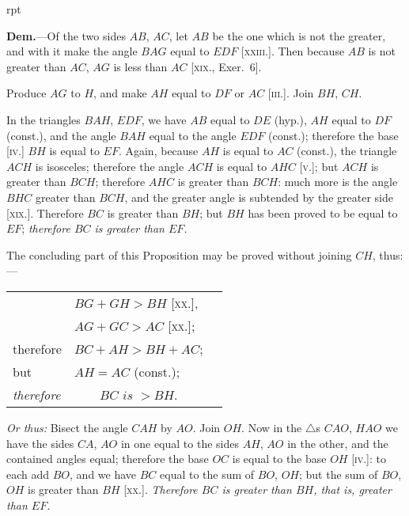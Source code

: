 \documentclass[oneside]{book}
\newcounter{wrapwidth}
\newcommand\imgflow[3]{
\setcounter{wrapwidth}{#1}

\begin{wrapfigure}[#2]{r}{\value{wrapwidth}pt}
\begin{center}
\vspace{-0.3in}

\end{center}
\end{wrapfigure}
}
\begin{document}
\imgflow{180}{12}{f041}

\textbf{Dem.}---Of the two sides $AB$, $AC$, let $AB$ be the one
which is not the greater, and with it make the angle
$BAG$ equal to $EDF$ [\textsc{xxiii}.]. Then because $AB$ is not
greater than $AC$, $AG$ is less than $AC$ [\textsc{xix}., Exer.~6].

Produce $AG$ to $H$, and make $AH$ equal to $DF$ or $AC$
[\textsc{iii.}]. Join $BH$, $CH$.

In the triangles
$BAH$, $EDF$, we have
$AB$ equal to $DE$
(hyp.), $AH$ equal to
$DF$ (const.), and the
angle $BAH$ equal
to the angle $EDF$
(const.); therefore the
base [\textsc{iv.}] $BH$ is equal
to $EF$. Again, because
$AH$ is equal to $AC$ (const.), the triangle $ACH$ is isosceles;
therefore the angle $ACH$ is equal to $AHC$ [\textsc{v.}];
but $ACH$ is greater than $BCH$; therefore $AHC$ is
greater than $BCH$: much more is the angle $BHC$
greater than $BCH$, and the greater angle is subtended
by the greater side [\textsc{xix.}]. Therefore $BC$ is greater
than $BH$; but $BH$ has been proved to be equal to $EF$;
\textit{therefore $BC$ is greater than $EF$.}\par\medskip

\begin{footnotesize}
The concluding part of this Proposition may be proved without
joining $CH$, thus:---
\\
\begin{tabular*}{\textwidth}{@{} l@{\extracolsep\fill} l r}
& $BG + GH > BH$ [\textsc{xx.}], &\phantom{therefore}  \\[.5ex]
& $AG + GC > AC$ [\textsc{xx.}]; \\[.5ex]
therefore & $BC + AH > BH + AC$; \\[.5ex]
but & $AH = AC$ (const.); \\[.5ex]
\textit{therefore} & \multicolumn{1}{c}{$BC \textit{ is } > BH$.}
\end{tabular*}\par\medskip

\textit{Or thus:} Bisect the angle $CAH$ by $AO$. Join $OH$. Now in
the $\triangle$s $CAO$, $HAO$ we have the sides $CA$, $AO$ in one equal to
the sides $AH$, $AO$ in the other, and the contained angles equal;
therefore the base $OC$ is equal to the base $OH$ [\textsc{iv.}]: to each add
$BO$, and we have $BC$ equal to the sum of $BO$, $OH$; but the sum
of $BO$, $OH$ is greater than $BH$ [\textsc{xx.}]. \textit{Therefore $BC$ is greater
than $BH$, that is, greater than $EF$.}
\par\end{footnotesize}
\end{document}
